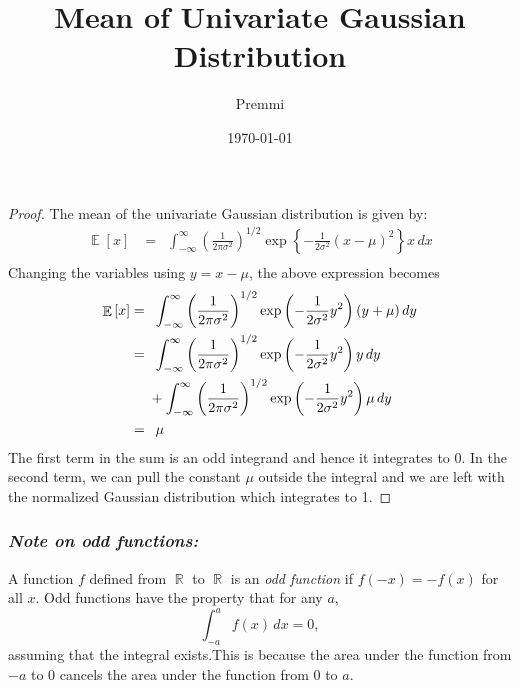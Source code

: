 \documentclass[14pt]{extarticle}
\title{Mean of Univariate Gaussian Distribution}
\author{Premmi}
\date{\today}
\DeclareMathOperator{\E}{\mathbb{E}}
\DeclareMathOperator{\R}{\mathbb{R}}
\begin{document}
    
\maketitle
\begin{flushleft}	
\begin{proof} 
The mean of the univariate Gaussian distribution is given by: 
\begin{align}
\E\left[x\right] &= \,\,\,\int_{-\infty}^{\infty} \left(\frac{1}{2\pi\sigma^2}\right)^{1/2}\exp\left\lbrace-\frac{1}{2\sigma^2}\left(x-\mu\right)^2\right\rbrace x\,dx\\
\end{align}  
Changing the variables using $y = x - \mu$, the above expression becomes
\begin{align}
\E\left[x\right] &= \,\,\,\int_{-\infty}^{\infty} \left(\frac{1}{2\pi\sigma^2}\right)^{1/2}\exp\left(-\frac{1}{2\sigma^2}y^2\right)\left(y+\mu\right)dy\\
&=\,\,\,\int_{-\infty}^{\infty} \left(\frac{1}{2\pi\sigma^2}\right)^{1/2}\exp\left(-\frac{1}{2\sigma^2}y^2\right)y\,dy \notag\\\ &\,\,\,\,\,\,\,\,+ \int_{-\infty}^{\infty} \left(\frac{1}{2\pi\sigma^2}\right)^{1/2}\exp\left(-\frac{1}{2\sigma^2}y^2\right)\mu\,dy\\
&= \,\,\,\mu
\end{align}
The first term in the sum is an odd integrand and hence it integrates to 0. In the second term, we can pull the constant $\mu$ outside the integral and we are left with the normalized Gaussian distribution which integrates to 1.
\end{proof}	
\subsubsection*{\textit{Note on odd functions:}}
A function $f$ defined from $\R$ to $\R$ is an \textit{odd function} if $f(-x) = -f(x)$ for all $x$. Odd functions have the property that for any $a$, $$\int_{-a}^{a}f(x)\,dx = 0,$$ assuming that the integral exists.This is because the area under the function from
$-a$ to 0 cancels the area under the function from 0 to $a$.


\end{flushleft}
\end{document}
